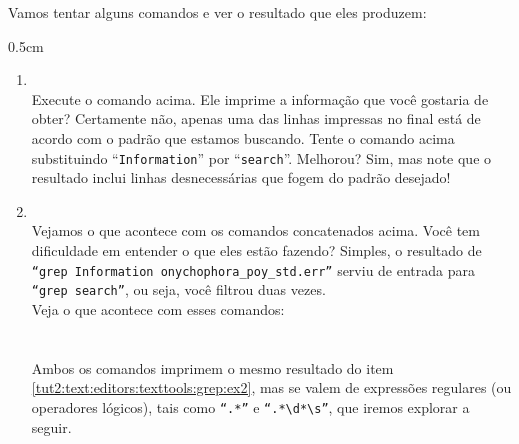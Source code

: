 \begin{refsection}
Vamos tentar alguns comandos e ver o resultado que eles produzem:

\begin {myindentpar}{0.5cm}
\begin{enumerate}[\itshape i.]

 \item {}\label{tut2:text:editors:texttools:grep:ex1}\\	
	Execute o comando acima. Ele imprime a informação que você gostaria de obter? Certamente não, apenas uma das linhas impressas no final está de acordo com o padrão que estamos buscando. Tente o comando acima substituindo ``\texttt{Information}'' por ``\texttt{search}''. Melhorou? Sim, mas note que o resultado inclui linhas desnecessárias que fogem do padrão desejado!

 \item {}\label{tut2:text:editors:texttools:grep:ex2}\\
	Vejamos o que acontece com os comandos concatenados acima. Você tem dificuldade em entender o que eles estão fazendo? Simples, o resultado de \texttt{``grep Information onychophora\_poy\_std.err''} serviu de entrada para \texttt{``grep search''}, ou seja, você filtrou duas vezes.\\

Veja o que acontece com esses comandos:\\
 \\

 \\

Ambos os comandos imprimem o mesmo resultado do item \ref{tut2:text:editors:texttools:grep:ex2}, mas se valem de expressões regulares (ou operadores lógicos), tais como \texttt{``.*''} e \texttt{``.*\textbackslash d*\textbackslash s''}, que iremos explorar a seguir.


\end{enumerate}
\end{myindentpar}


\end{refsection}
